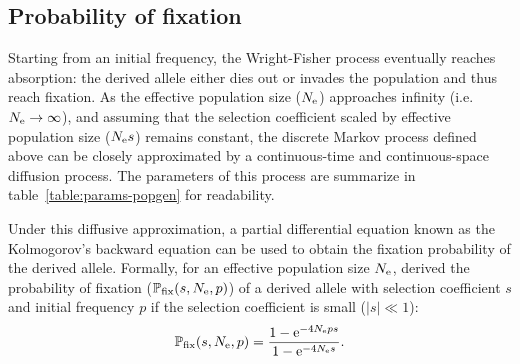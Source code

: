 \subsection{Probability of fixation}

Starting from an initial frequency, the Wright-Fisher process eventually reaches absorption: the derived allele either dies out or invades the population and thus reach fixation.
As the effective population size ($N_{\text{e}}$) approaches infinity (i.e.~$ N_{\text{e}} \to \infty$), and assuming that the selection coefficient scaled by effective population size ($N_{\text{e}} s $) remains constant, the discrete Markov process defined above can be closely approximated by a continuous-time and continuous-space diffusion process.
The parameters of this process are summarize in table~\ref{table:params-popgen} for readability.

\begin{table}[H]
    \centering
    \noindent{}
    \caption[Parameters of population genetics]{Parameters of population genetics}\label{table:params-popgen}
\end{table}

Under this diffusive approximation, a partial differential equation known as the Kolmogorov's backward equation can be used to obtain the fixation probability of the derived allele.
Formally, for an effective population size $N_{\text{e}}$, \citet{Kimura1962} derived the probability of fixation ($\mathbb{P}_{\text{fix}}(s, N_{\text{e}}, p)$) of a derived allele with selection coefficient $s$ and initial frequency $p$ if the selection coefficient is small ($|s| \ll 1$):
\begin{equation}
    \mathbb{P}_{\text{fix}}(s, N_{\text{e}}, p) = \dfrac{1 - \text{e}^{-4 N_{\text{e}} p s }}{1 - \text{e}^{-4 N_{\text{e}} s}}.
\end{equation}

